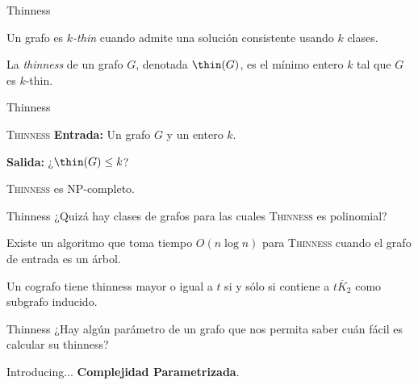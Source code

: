 \documentclass[spanish]{beamer}
\begin{document}
\begin{frame}{Thinness}
    \begin{definition}[$k$-thin]
        Un grafo es \emph{$k$-thin} cuando admite una solución consistente usando $k$ clases.
    \end{definition}

    \pause
    \begin{definition}[Thinness]
        La \emph{thinness} de un grafo $G$, denotada $\thin(G)$, es el mínimo entero $k$ tal que $G$ es $k$-thin.
    \end{definition}
\end{frame}

\begin{frame}{Thinness}
    \begin{block}{\textsc{Thinness}}
        \textbf{Entrada:} Un grafo $G$ y un entero $k$.

        \textbf{Salida:} ¿$\thin(G) \leq k$?
    \end{block}

    \pause
    \begin{theorem}
        \textsc{Thinness} es NP-completo.
    \end{theorem}
\end{frame}

\begin{frame}{Thinness}
    ¿Quizá hay clases de grafos para las cuales \textsc{Thinness} es polinomial?
    \pause

    \begin{theorem}
        Existe un algoritmo que toma tiempo $O(n \log n)$ para \textsc{Thinness} cuando el grafo de entrada es un árbol. 
    \end{theorem}

    \pause    
    \begin{theorem}
        Un cografo tiene thinness mayor o igual a $t$ si y sólo si contiene a $\overline{t K_2}$ como subgrafo inducido. 
    \end{theorem}

\end{frame}

\begin{frame}{Thinness}
    ¿Hay algún parámetro de un grafo que nos permita saber cuán fácil es calcular su thinness?
    \vspace{1em}

    \pause
    Introducing... \textbf{Complejidad Parametrizada}.
\end{frame}
\end{document}
